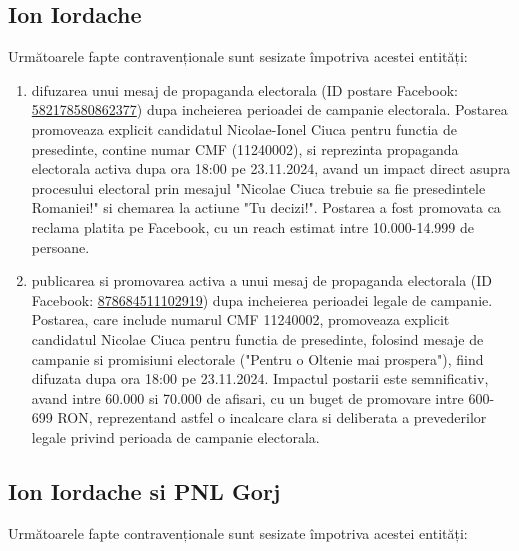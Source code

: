 \documentclass[a4paper,12pt]{article}
\begin{document}
\vspace{0.5cm}

\subsection{Ion Iordache}
Următoarele fapte contravenționale sunt sesizate împotriva acestei entități:

\begin{enumerate}[leftmargin=*, label=\arabic*.)]
    \item difuzarea unui mesaj de propaganda electorala (ID postare Facebook: \href{https://www.facebook.com/ads/library/?id=582178580862377}{582178580862377}) dupa incheierea perioadei de campanie electorala. Postarea promoveaza explicit candidatul Nicolae-Ionel Ciuca pentru functia de presedinte, contine numar CMF (11240002), si reprezinta propaganda electorala activa dupa ora 18:00 pe 23.11.2024, avand un impact direct asupra procesului electoral prin mesajul "Nicolae Ciuca trebuie sa fie presedintele Romaniei!" si chemarea la actiune "Tu decizi!". Postarea a fost promovata ca reclama platita pe Facebook, cu un reach estimat intre 10.000-14.999 de persoane.
    \item publicarea si promovarea activa a unui mesaj de propaganda electorala (ID Facebook: \href{https://www.facebook.com/ads/library/?id=878684511102919}{878684511102919}) dupa incheierea perioadei legale de campanie. Postarea, care include numarul CMF 11240002, promoveaza explicit candidatul Nicolae Ciuca pentru functia de presedinte, folosind mesaje de campanie si promisiuni electorale ("Pentru o Oltenie mai prospera"), fiind difuzata dupa ora 18:00 pe 23.11.2024. Impactul postarii este semnificativ, avand intre 60.000 si 70.000 de afisari, cu un buget de promovare intre 600-699 RON, reprezentand astfel o incalcare clara si deliberata a prevederilor legale privind perioada de campanie electorala.
\end{enumerate}

\vspace{0.5cm}

\subsection{Ion Iordache si PNL Gorj}
Următoarele fapte contravenționale sunt sesizate împotriva acestei entități:
\end{document}
